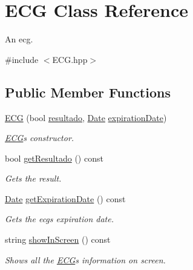 \hypertarget{class_e_c_g}{}\section{E\+CG Class Reference}
\label{class_e_c_g}


An ecg.  




{\ttfamily \#include $<$E\+C\+G.\+hpp$>$}

\subsection*{Public Member Functions}
\begin{DoxyCompactItemize}
\item 
\hyperlink{class_e_c_g_a4405d7c131f1cfd7262444fe65062461}{E\+CG} (bool \hyperlink{class_e_c_g_a29fc67e15b0e5ec13bd4feef93a59df0}{resultado}, \hyperlink{class_date}{Date} \hyperlink{class_e_c_g_a5b4f40c0eb92a88ebc2817ff09dcced9}{expiration\+Date})
\begin{DoxyCompactList}\small\item\em \hyperlink{class_e_c_g}{E\+CG}\textquotesingle{}s constructor. \end{DoxyCompactList}\item 
bool \hyperlink{class_e_c_g_a118ae9d00eff2b226cddff1aeb4e03fc}{get\+Resultado} () const
\begin{DoxyCompactList}\small\item\em Gets the result. \end{DoxyCompactList}\item 
\hyperlink{class_date}{Date} \hyperlink{class_e_c_g_afb89fa72e295fcac879c4bc341395bd4}{get\+Expiration\+Date} () const
\begin{DoxyCompactList}\small\item\em Gets the ecg\textquotesingle{}s expiration date. \end{DoxyCompactList}\item 
string \hyperlink{class_e_c_g_a6c9db502ecbd3d09884fa7a89a194fda}{show\+In\+Screen} () const
\begin{DoxyCompactList}\small\item\em Shows all the \hyperlink{class_e_c_g}{E\+CG}\textquotesingle{}s information on screen. \end{DoxyCompactList}\end{DoxyCompactItemize}

